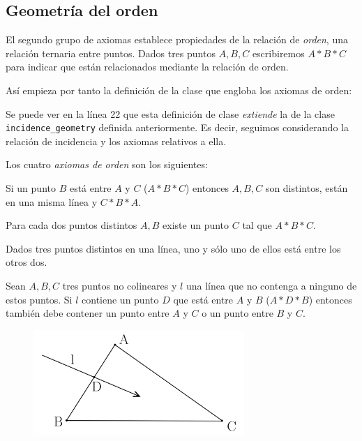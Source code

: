 \subsection{Geometría del orden}

El segundo grupo de axiomas establece propiedades de la relación de
\textit{orden}, una relación ternaria entre puntos. Dados tres puntos $A, B, C$
escribiremos $A * B * C$ para indicar que están relacionados mediante la
relación de orden.

Así empieza por tanto la definición de la clase que engloba los axiomas de
orden:


Se puede ver en la línea 22 que esta definición de clase \textit{extiende} la de
la clase \lstinline{incidence_geometry} definida anteriormente. Es decir,
seguimos considerando la relación de incidencia y los axiomas relativos a ella.

Los cuatro \textit{axiomas de orden} son los siguientes:

\begin{ax}\label{ax:B1}
	Si un punto $B$ está entre $A$ y $C$ ($A * B * C$) entonces $A, B, C$ son
	distintos, están en una misma línea y $C * B * A$.
\end{ax}


\begin{ax}\label{ax:B2}
	Para cada dos puntos distintos $A,B$ existe un punto $C$ tal que $A * B * C$.
\end{ax}


\begin{ax}\label{ax:3}
	Dados tres puntos distintos en una línea, uno y sólo uno de ellos está entre
	los otros dos.
\end{ax}


\begin{ax}[Pasch]\label{ax:4}
	Sean $A, B, C$ tres puntos no colineares y $l$ una línea que no contenga a
	ninguno de estos puntos. Si $l$ contiene un punto $D$ que está entre $A$ y $B$
	($A * D * B$) entonces también debe contener un punto entre $A$ y $C$ o un
	punto entre $B$ y $C$.
\end{ax}

\begin{figure}[htbp]
	\centerline{\includegraphics[width=8cm]{./imgs/pasch.png}}
	\label{figure:pasch}
\end{figure}

